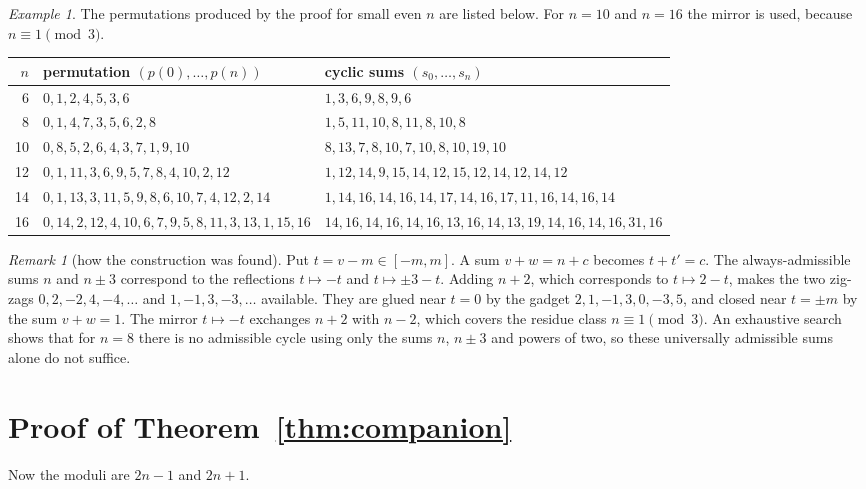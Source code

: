 \documentclass[11pt]{article}
\numberwithin{equation}{section}
\theoremstyle{definition}
\theoremstyle{remark}
\newtheorem{remark}[theorem]{Remark}
\newtheorem{example}[theorem]{Example}
\begin{document}
\begin{example}\label{ex:even}
The permutations produced by the proof for small even $n$ are listed below. For $n=10$ and $n=16$
the mirror is used, because $n\equiv1\pmod3$.
\begin{center}\footnotesize
\begin{tabular}{@{}rll@{}}
\toprule
$n$ & permutation $(p(0),\dots,p(n))$ & cyclic sums $(s_0,\dots,s_n)$\\
\midrule
6 & $0,1,2,4,5,3,6$ & $1,3,6,9,8,9,6$\\
8 & $0,1,4,7,3,5,6,2,8$ & $1,5,11,10,8,11,8,10,8$\\
10 & $0,8,5,2,6,4,3,7,1,9,10$ & $8,13,7,8,10,7,10,8,10,19,10$\\
12 & $0,1,11,3,6,9,5,7,8,4,10,2,12$ & $1,12,14,9,15,14,12,15,12,14,12,14,12$\\
14 & $0,1,13,3,11,5,9,8,6,10,7,4,12,2,14$ & $1,14,16,14,16,14,17,14,16,17,11,16,14,16,14$\\
16 & $0,14,2,12,4,10,6,7,9,5,8,11,3,13,1,15,16$ & $14,16,14,16,14,16,13,16,14,13,19,14,16,14,16,31,16$\\
\bottomrule
\end{tabular}
\end{center}
\end{example}

\begin{remark}[how the construction was found]
Put $t=v-m\in[-m,m]$. A sum $v+w=n+c$ becomes $t+t'=c$. The always-admissible sums $n$ and $n\pm3$
correspond to the reflections $t\mapsto -t$ and $t\mapsto\pm3-t$. Adding $n+2$, which corresponds to
$t\mapsto 2-t$, makes the two zig-zags $0,2,-2,4,-4,\dots$ and $1,-1,3,-3,\dots$ available. They are
glued near $t=0$ by the gadget $2,1,-1,3,0,-3,5$, and closed near $t=\pm m$ by the sum $v+w=1$. The
mirror $t\mapsto-t$ exchanges $n+2$ with $n-2$, which covers the residue class $n\equiv1\pmod 3$. An exhaustive search shows that for $n=8$ there is no admissible cycle using only the sums $n$,
$n\pm3$ and powers of two, so these universally admissible sums alone do not suffice.
\end{remark}

\section{Proof of \texorpdfstring{Theorem~\ref{thm:companion}}{Theorem 1.3}}\label{sec:companion}

Now the moduli are $2n-1$ and $2n+1$.
\end{document}
